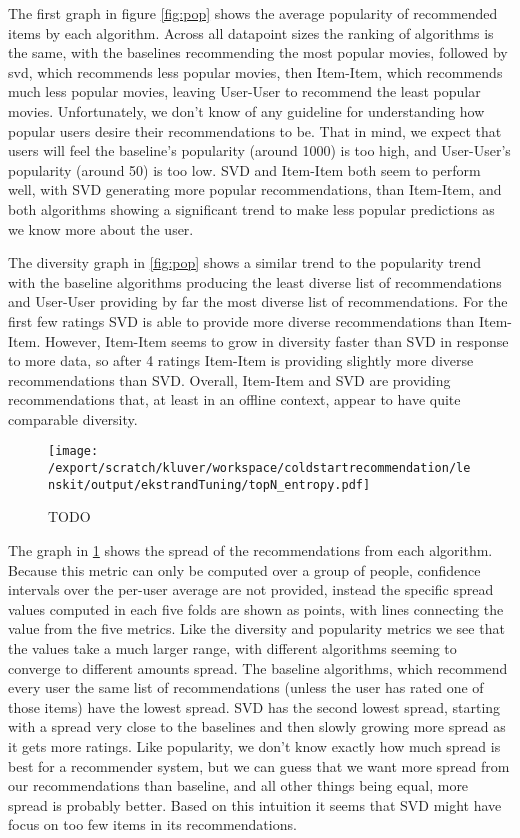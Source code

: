 \documentclass[letterpaper]{sig-alternate}
\begin{document}
  The first graph in figure \ref{fig:pop} shows the average popularity of recommended items by each algorithm.
  Across all datapoint sizes the ranking of algorithms is the same, with the baselines recommending the most popular movies, followed by svd, which recommends less popular movies, then Item-Item, which recommends much less popular movies, leaving User-User to recommend the least popular movies.
  Unfortunately, we don't know of any guideline for understanding how popular users desire their recommendations to be.
  That in mind, we expect that users will feel the baseline's popularity (around 1000) is too high, and User-User's popularity (around 50) is too low.
  SVD and Item-Item both seem to perform well, with SVD generating more popular recommendations, than Item-Item, and both algorithms showing a significant trend to make less popular predictions as we know more about the user.

  The diversity graph in \ref{fig:pop} shows a similar trend to the popularity trend with the baseline algorithms producing the least diverse list of recommendations and User-User providing by far the most diverse list of recommendations.
  For the first few ratings SVD is able to provide more diverse recommendations than Item-Item.
  However, Item-Item seems to grow in diversity faster than SVD in response to more data, so after 4 ratings Item-Item is providing slightly more diverse recommendations than SVD.
  Overall, Item-Item and SVD are providing recommendations that, at least in an offline context, appear to have quite comparable diversity.


\begin{figure}[ht!]
  \centering
  \texttt{[image: /export/scratch/kluver/workspace/coldstartrecommendation/lenskit/output/ekstrandTuning/topN\_entropy.pdf]}
  \caption{TODO}
  \label{fig:spread}
\end{figure}


  The graph in \ref{fig:spread} shows the spread of the recommendations from each algorithm.
  Because this metric can only be computed over a group of people, confidence intervals over the per-user average are not provided, instead the specific spread values computed in each five folds are shown as points, with lines connecting the value from the five metrics.
  Like the diversity and popularity metrics we see that the values take a much larger range, with different algorithms seeming to converge to different amounts spread.
  The baseline algorithms, which recommend every user the same list of recommendations (unless the user has rated one of those items) have the lowest spread.
  SVD has the second lowest spread, starting with a spread very close to the baselines and then slowly growing more spread as it gets more ratings.
  Like popularity, we don't know exactly how much spread is best for a recommender system, but we can guess that we want more spread from our recommendations than baseline, and all other things being equal, more spread is probably better.
  Based on this intuition it seems that SVD might have focus on too few items in its recommendations.
\end{document}
